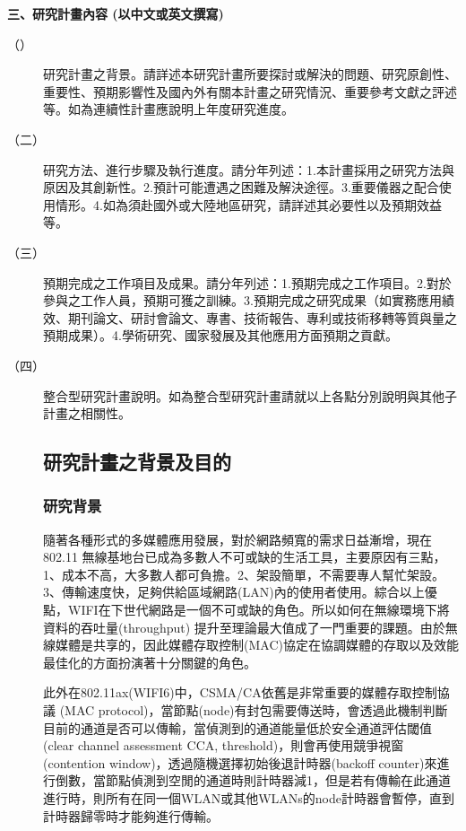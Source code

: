 \documentclass[12pt,a4paper]{article}
\begin{document}
\newtheorem{thm}{Theorem}
\newtheorem{lem}{Lemma}
\newtheorem{cor}{Corollary}
\newtheorem{prop}{Proposition}
\newtheorem{conj}{Conjecture}

\baselineskip 7mm

\noindent
\textbf{\large 三、研究計畫內容 (以中文或英文撰寫)}
\begin{description}
\item[（）]研究計畫之背景。請詳述本研究計畫所要探討或解決的問題、研究原創性、重要性、預期影響性及國內外有關本計畫之研究情況、重要參考文獻之評述等。如為連續性計畫應說明上年度研究進度。
\item[（二）]研究方法、進行步驟及執行進度。請分年列述：1.本計畫採用之研究方法與原因及其創新性。2.預計可能遭遇之困難及解決途徑。3.重要儀器之配合使用情形。4.如為須赴國外或大陸地區研究，請詳述其必要性以及預期效益等。
\item[（三）]預期完成之工作項目及成果。請分年列述：1.預期完成之工作項目。2.對於參與之工作人員，預期可獲之訓練。3.預期完成之研究成果（如實務應用績效、期刊論文、研討會論文、專書、技術報告、專利或技術移轉等質與量之預期成果）。4.學術研究、國家發展及其他應用方面預期之貢獻。
\item[（四）]整合型研究計畫說明。如為整合型研究計畫請就以上各點分別說明與其他子計畫之相關性。

\setlength\parindent{2em}    %

\setcounter{section}{3}
\setcounter{subsection}{0}

\subsection{研究計畫之背景及目的}
\subsubsection{研究背景}%
隨著各種形式的多媒體應用發展，對於網路頻寬的需求日益漸增，現在802.11 無線基地台已成為多數人不可或缺的生活工具，主要原因有三點，1、成本不高，大多數人都可負擔。2、架設簡單，不需要專人幫忙架設。3、傳輸速度快，足夠供給區域網路(LAN)內的使用者使用。綜合以上優點，WIFI在下世代網路是一個不可或缺的角色。所以如何在無線環境下將資料的吞吐量(throughput) 提升至理論最大值成了一門重要的課題。由於無線媒體是共享的，因此媒體存取控制(MAC)協定在協調媒體的存取以及效能最佳化的方面扮演著十分關鍵的角色。

此外\cite{31}在802.11ax(WIFI6)中，CSMA/CA依舊是非常重要的媒體存取控制協議 (MAC protocol)，當節點(node)有封包需要傳送時，會透過此機制判斷目前的通道是否可以傳輸，當偵測到的通道能量低於安全通道評估閾值(clear channel assessment CCA, threshold)，則會再使用競爭視窗(contention window)，透過隨機選擇初始後退計時器(backoff counter)來進行倒數，當節點偵測到空閒的通道時則計時器減1，但是若有傳輸在此通道進行時，則所有在同一個WLAN或其他WLANs的node計時器會暫停，直到計時器歸零時才能夠進行傳輸。


\end{description}
\end{document}
